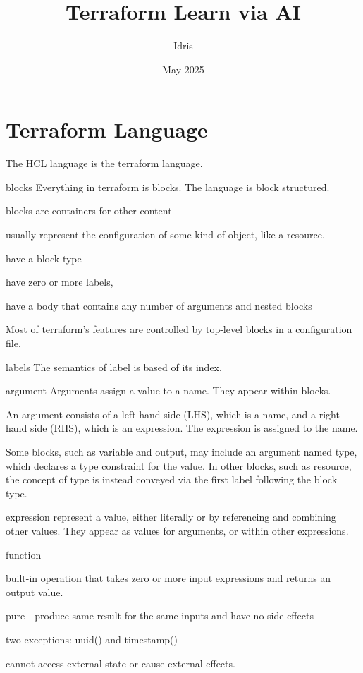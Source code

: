 \documentclass[openany, 12pt]{book}
\title{Terraform Learn via AI}
\author{Idris}
\date{May 2025}
\begin{document}
\chapter{Terraform Language}
The HCL language is the terraform language.

\begin{definition}{blocks}{}
	Everything in terraform is blocks. The language is block structured.

	\begin{alist}
		\item blocks are containers for other content
		\item usually represent the configuration of some kind of object, like a
		resource.
		\item have a block type
		\item have zero or more labels,
		\item have a body that contains any number of arguments and nested blocks
	\end{alist}
	Most of terraform's features are controlled by top-level blocks in a
	configuration file.

\end{definition}

\begin{definition}{labels}{}
	The semantics of label is based of its index.
\end{definition}

\begin{definition}{argument}{}
	Arguments assign a value to a name. They appear within blocks.

	An argument consists of a left-hand side (LHS), which is a name, and a
	right-hand side (RHS), which is an expression. The expression is assigned to
	the name.

	Some blocks, such as variable and output, may include an argument named
	type, which declares a type constraint for the value. In other blocks, such
	as resource, the concept of type is instead conveyed via the first label
	following the block type.
\end{definition}

\begin{definition}{expression}{}
	represent a value, either literally or by referencing and combining other
	values. They appear as values for arguments, or within other expressions.
\end{definition}

\begin{definition}{function}{}
	\begin{alist}
		\item built-in operation that takes zero or more input expressions and
		returns an output value.
		\item pure---produce same result for the same inputs and have no side effects
		\item two exceptions: uuid() and timestamp()
		\item cannot access external state or cause external effects.
	\end{alist}
\end{definition}
\end{document}
